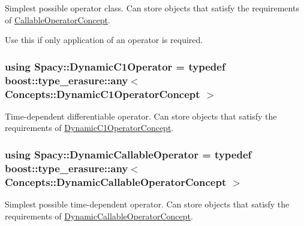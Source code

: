 Simplest possible operator class. Can store objects that satisfy the requirements of \hyperlink{group__ConceptGroup_gadec0c664abaacc2065dadd8b11cc8d30_CallableOperatorConceptAnchor}{Callable\+Operator\+Concept}. 

\label{group__SpacyGroup_ga2b74020d806ad800795cdd97dab3466f_CallableOperatorAnchor}%
\hypertarget{group__SpacyGroup_ga2b74020d806ad800795cdd97dab3466f_CallableOperatorAnchor}{}%
Use this if only application of an operator is required. \hypertarget{group__SpacyGroup_gabc9c830d2a7e020bcab097b10ee6f642_gabc9c830d2a7e020bcab097b10ee6f642}{}
\subsubsection[{Dynamic\+C1\+Operator}]{\setlength{\rightskip}{0pt plus 5cm}using {\bf Spacy\+::\+Dynamic\+C1\+Operator} = typedef boost\+::type\+\_\+erasure\+::any$<$ {\bf Concepts\+::\+Dynamic\+C1\+Operator\+Concept} $>$}\label{group__SpacyGroup_gabc9c830d2a7e020bcab097b10ee6f642_gabc9c830d2a7e020bcab097b10ee6f642}


Time-\/dependent differentiable operator. Can store objects that satisfy the requirements of \hyperlink{group__ConceptGroup_gaa7ef0ce2d66b0610035541b580564b11_DynamicC1OperatorConceptAnchor}{Dynamic\+C1\+Operator\+Concept}. 

\label{group__SpacyGroup_gabc9c830d2a7e020bcab097b10ee6f642_DynamicC1OperatorAnchor}%
\hypertarget{group__SpacyGroup_gabc9c830d2a7e020bcab097b10ee6f642_DynamicC1OperatorAnchor}{}%
\hypertarget{group__SpacyGroup_ga750d55072f7a3a16a1263961147333c0_ga750d55072f7a3a16a1263961147333c0}{}
\subsubsection[{Dynamic\+Callable\+Operator}]{\setlength{\rightskip}{0pt plus 5cm}using {\bf Spacy\+::\+Dynamic\+Callable\+Operator} = typedef boost\+::type\+\_\+erasure\+::any$<$ {\bf Concepts\+::\+Dynamic\+Callable\+Operator\+Concept} $>$}\label{group__SpacyGroup_ga750d55072f7a3a16a1263961147333c0_ga750d55072f7a3a16a1263961147333c0}


Simplest possible time-\/dependent operator. Can store objects that satisfy the requirements of \hyperlink{group__ConceptGroup_ga30692db093ead5a1a074905363a2f043_DynamicCallableOperatorConceptAnchor}{Dynamic\+Callable\+Operator\+Concept}. 

